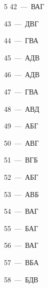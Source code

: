 \documentclass[12pt]{article}
\begin{document}
\begin{multicols}{5}
\mbox{42~--- ВАГ}\par
\mbox{43~--- ДВГ}\par
\mbox{44~--- ГВА}\par
\mbox{45~--- АДВ}\par
\mbox{46~--- АДВ}\par
\mbox{47~--- ГВА}\par
\mbox{48~--- АВД}\par
\mbox{49~--- АБГ}\par
\mbox{50~--- АВГ}\par
\mbox{51~--- ВГБ}\par
\mbox{52~--- АБГ}\par
\mbox{53~--- АВБ}\par
\mbox{54~--- ВАГ}\par
\mbox{55~--- БАГ}\par
\mbox{56~--- ВАГ}\par
\mbox{57~--- ВБА}\par
\mbox{58~--- БДВ}
\end{multicols}
\end{document}
